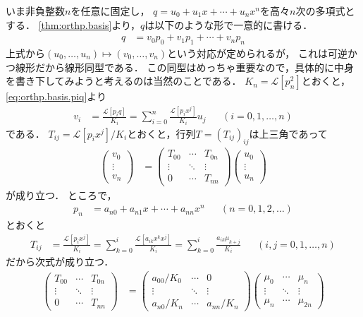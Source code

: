 \documentclass{jlreq}
\theoremstyle{definition}
\newcommand{\mcL}{\mathcal{L}}
\begin{document}
いま非負整数\(n\)を任意に固定し，
\(q=u_0+u_1x+\cdots+u_n x^n\)を高々\(n\)次の多項式とする．
\cref{thm:orthp.basis}より，\(q\)は以下のような形で一意的に書ける．
\begin{align}
  q &= v_0 p_0+v_1 p_1+\cdots+v_n p_n
\end{align}
上式から\((u_0,\dots,u_n)\longmapsto(v_0,\dots,v_n)\)という対応が定められるが，
これは可逆かつ線形だから線形同型である．
この同型はめっちゃ重要なので，具体的に中身を書き下してみようと考えるのは当然のことである．
\(K_n=\mcL[p_n^2]\)とおくと，
\cref{eq:orthp.basis.piq}より
\begin{align}
  v_i
  &= \frac{\mcL[p_i q]}{K_i}
  = \sum_{i=0}^n \frac{\mcL[p_i x^j]}{K_i} u_j
  & &(i=0,1,\dots,n)
\end{align}
である．
\(T_{ij}=\mcL[p_i x^j]/K_i\)とおくと，行列\(T=(T_{ij})_{ij}\)は上三角であって
\begin{align}
  \begin{pmatrix}
    v_0 \\ \vdots \\ v_n
  \end{pmatrix}
  &=
  \begin{pmatrix}
    T_{00} & \cdots & T_{0n} \\
    \vdots & \ddots & \vdots \\
    0 & \cdots & T_{nn}
  \end{pmatrix}
  \begin{pmatrix}
    u_0 \\ \vdots \\ u_n
  \end{pmatrix}
\end{align}
が成り立つ．
ところで，
\begin{align}
  p_n &= a_{n0} + a_{n1} x + \cdots + a_{nn}x^n
  & &(n=0,1,2,\dots)
\end{align}
とおくと
\begin{align}
  T_{ij}
  &= \frac{\mcL[p_i x^j]}{K_i}
  = \sum_{k=0}^i \frac{\mcL[a_{ik}x^k x^j]}{K_i}
  = \sum_{k=0}^i \frac{a_{ik}\mu_{k+j}}{K_i}
  & &(i, j=0,1,\dots,n)
\end{align}
だから次式が成り立つ．
\begin{align}
  \begin{pmatrix}
    T_{00} & \cdots & T_{0n} \\
    \vdots & \ddots & \vdots \\
    0 & \cdots & T_{nn}
  \end{pmatrix}
  &=
  \begin{pmatrix}
    a_{00}/K_0 & \cdots & 0 \\
    \vdots & \ddots & \vdots \\
    a_{n0}/K_n & \cdots & a_{nn}/K_n
  \end{pmatrix}
  \begin{pmatrix}
    \mu_0 & \cdots & \mu_n \\
    \vdots & \ddots & \vdots \\
    \mu_n & \cdots & \mu_{2n}
  \end{pmatrix}
  \label{eq:T.AH}
\end{align}
\end{document}
